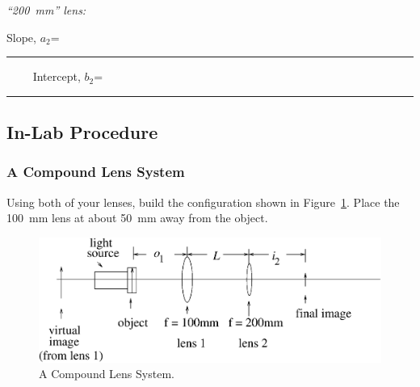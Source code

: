 \noindent
{\it ``200~mm'' lens:}
\begin{center}
Slope, $a_2$=~\rule{3cm}{.1mm} ~~~~
Intercept, $b_2$=~\rule{3cm}{.1mm}
\end{center}
\vspace*{.5cm}

\subsection{In-Lab Procedure}

\subsubsection{A Compound Lens System} 

\noindent Using both of your lenses, build the configuration shown in 
Figure~\ref{fig:opt:compoundlens}. Place the 100~mm lens at about 50~mm away from the object.\\

\begin{figure}[htb]
\centering 
\epsfxsize=9.5cm \includegraphics[scale=0.6]{9_imaging/compoundlens.eps}
\caption{A Compound Lens System.}
\label{fig:opt:compoundlens}
\end{figure}

\ \\

